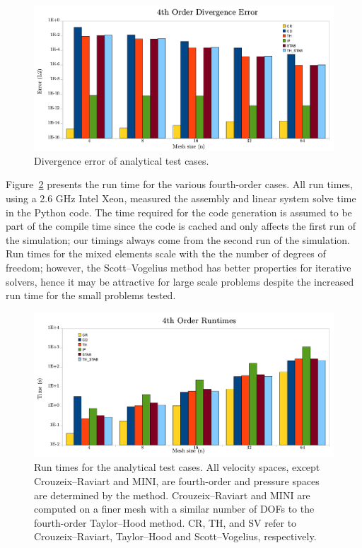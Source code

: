 \begin{figure}
  \center\includegraphics[width=\largefig]{chapters/terrel/pdf/div_4.pdf}
  \caption{Divergence error of analytical test cases.}
  \label{fig:terrel:4th_Order:div}
\end{figure}

Figure~\ref{fig:terrel:4th_Order:run} presents the run time for the
various fourth-order cases.  All run times, using a 2.6 GHz Intel Xeon,
measured the assembly and linear system solve time in the Python code. The
time required for the code generation is assumed to be part of the compile
time since the code is cached and only affects the first run of the
simulation; our timings always come from the second run of the simulation.
Run times for the mixed elements scale with the the number of degrees of
freedom; however, the Scott--Vogelius method has better properties for
iterative solvers, hence it may be attractive for large scale problems
despite the increased run time for the small problems tested.

\begin{figure}
  \center \includegraphics[width=\largefig]{chapters/terrel/pdf/run_4.pdf}
  \caption{Run times for the analytical test cases.  All velocity spaces,
    except Crouzeix--Raviart and MINI, are fourth-order and pressure
    spaces are determined by the method. Crouzeix--Raviart and MINI
    are computed on a finer mesh with a similar number of DOFs to
    the fourth-order Taylor--Hood method. CR, TH, and SV refer to
    Crouzeix--Raviart, Taylor--Hood and Scott--Vogelius, respectively.}
  \label{fig:terrel:4th_Order:run}
\end{figure}

